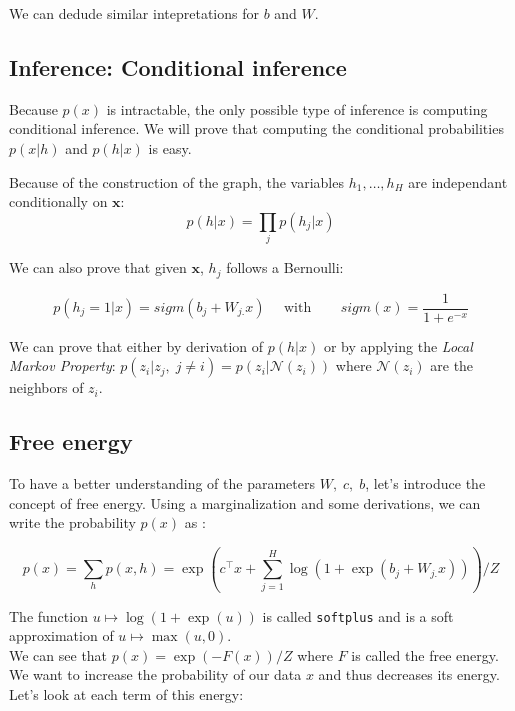 \documentclass{article}
\begin{document}
We can dedude similar intepretations for $b$ and $W$.


\subsection{Inference: Conditional inference}

Because $p(x)$ is intractable, the only possible type of inference is computing conditional inference. We will prove that computing the conditional probabilities $p(x|h)$ and $p(h|x)$ is easy.

Because of the construction of the graph, the variables $h_1, \hdots, h_H$ are independant conditionally on $\mathbf{x}$: \[p(h|x) = \prod_j p(h_j|x)\]

We can also prove that given $\mathbf{x}$, $h_j$ follows a Bernoulli:

\[ p(h_j=1|x) = sigm(b_j + W_{j.}x) ~~~~~~ \text{with } ~~~~~~~~  sigm(x) = \frac{1}{1+e^{-x}} \]


We can prove that either by derivation of  $p(h|x)$ or by applying the \emph{Local Markov Property}: $p(z_i|z_j, \; j \neq i) =  p(z_i|\mathcal{N}(z_i))$ where $\mathcal{N}(z_i)$ are the neighbors of $z_i$.

\subsection{Free energy}

To have a better understanding of the parameters $W,\; c,\; b$, let's introduce the concept of free energy. Using a marginalization and some derivations, we can write the probability $p(x)$ as :

\[ p(x) = \sum_h p(x,h) = \exp\left(c^\top x + \sum_{j=1}^H \log\left( 1+\exp(b_j + W_{j.}x) \right) \right) / Z \]

The function $u \mapsto \log\left( 1+\exp(u) \right)$ is called \texttt{softplus} and is a soft approximation of $u \mapsto \max(u,0)$. \\

We can see that $p(x) = \exp\left(-F(x)\right) / Z$ where $F$ is called the free energy. We want to increase the probability of our data $x$ and thus decreases its energy. Let's look at each term of this energy:
\end{document}
